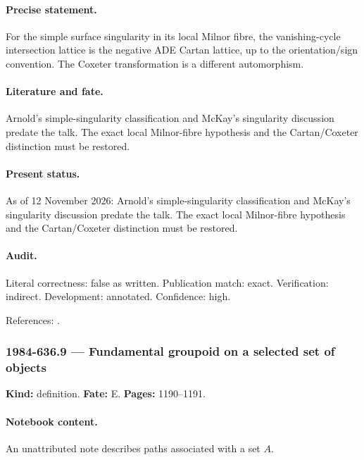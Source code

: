 \paragraph{Precise statement.} For the simple surface singularity in its local Milnor fibre, the vanishing-cycle intersection lattice is the negative ADE Cartan lattice, up to the orientation/sign convention. The Coxeter transformation is a different automorphism.

\paragraph{Literature and fate.} Arnold's simple-singularity classification and McKay's singularity discussion predate the talk. The exact local Milnor-fibre hypothesis and the Cartan/Coxeter distinction must be restored.

\paragraph{Present status.} As of 12 November 2026: Arnold's simple-singularity classification and McKay's singularity discussion predate the talk. The exact local Milnor-fibre hypothesis and the Cartan/Coxeter distinction must be restored.

\paragraph{Audit.} Literal correctness: false as written. Publication match: exact. Verification: indirect. Development: annotated. Confidence: high.

\noindent References: \citep{arnold1972normal,mckay1980graphs}.\par

\subsubsection{1984-636.9 --- Fundamental groupoid on a selected set of objects}

\label{item:1984-636.9}

\noindent\textbf{Kind:} definition. \textbf{Fate:} E. \textbf{Pages:} 1190--1191.\par

\paragraph{Notebook content.} An unattributed note describes paths associated with a set \(A\).

